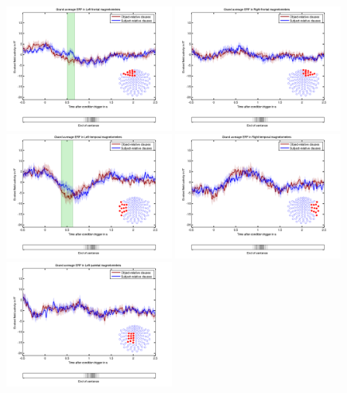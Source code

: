 \begin{figure}[h]
\begin{center}
\vspace{7mm}
\includegraphics[width=0.49\textwidth]{pics/children_Left-frontal-magnetometers.png}
\includegraphics[width=0.49\textwidth]{pics/children_Right-frontal-magnetometers.png}
\includegraphics[width=0.49\textwidth]{pics/children_Left-temporal-magnetometers.png}
\includegraphics[width=0.49\textwidth]{pics/children_Right-temporal-magnetometers.png}
\includegraphics[width=0.49\textwidth]{pics/children_Left-parietal-magnetometers.png}

\end{center}
\end{figure}
